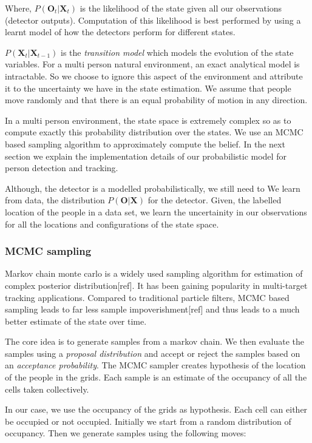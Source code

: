 Where, $P(\textbf{O}_{t} | \textbf{X}_{t})$ is the likelihood of the state given all our observations (detector outputs). Computation of this likelihood is best performed by using a learnt model of how the detectors perform for different states.

$P(\textbf{X}_{t}|\textbf{X}_{t-1})$ is the \textit{transition model} which models the evolution of the state variables. For a multi person natural environment, an exact analytical model is intractable. So we choose to ignore this aspect of the environment and attribute it to the uncertainty we have in the state estimation. We assume that people move randomly and that there is an equal probability of motion in any direction. 

In a multi person environment, the state space is extremely complex so as to compute exactly this probability 
distribution over the states. We use an MCMC based sampling algorithm to approximately compute the belief. In the next section we explain the implementation details of our probabilistic model for person detection and tracking.


Although, the detector is a modelled probabilistically, we still need to
We learn from data, the distribution $P(\textbf{O}|\textbf{X})$ for the detector. Given, the labelled location of the people in a data set, we learn the uncertainity in our observations for all the locations and configurations of the state space.
\subsubsection{MCMC sampling}
Markov chain monte carlo is a widely used sampling algorithm for estimation of complex posterior distribution[ref]. It has been gaining popularity in multi-target tracking applications. Compared to traditional particle filters, MCMC based sampling leads to far less sample impoverishment[ref] and thus leads to a much better estimate of the state over time.

The core idea is to generate samples from a markov chain. We then evaluate the samples using a \textit{proposal distribution} and accept or reject the samples based on an \textit{acceptance probability}. The MCMC sampler creates hypothesis of the location of the people in the grids. Each sample is an estimate of the occupancy of all the cells taken collectively. 

In our case, we use the occupancy of the grids as hypothesis. Each cell can either be occupied or not occupied. Initially we start from a random distribution of occupancy. Then we generate samples using the following moves:


